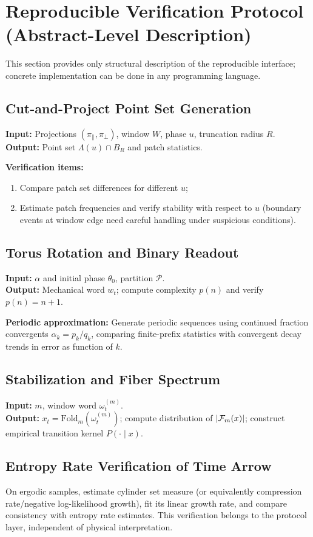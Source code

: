 \section{Reproducible Verification Protocol (Abstract-Level Description)}

This section provides only structural description of the reproducible interface; concrete implementation can be done in any programming language.

\subsection{Cut-and-Project Point Set Generation}

\textbf{Input:} Projections $(\pi_{\parallel},\pi_{\perp})$, window $W$, phase $u$, truncation radius $R$.\\
\textbf{Output:} Point set $\Lambda(u)\cap B_R$ and patch statistics.

\textbf{Verification items:}
\begin{enumerate}
  \item Compare patch set differences for different $u$;
  \item Estimate patch frequencies and verify stability with respect to $u$ (boundary events at window edge need careful handling under suspicious conditions).
\end{enumerate}

\subsection{Torus Rotation and Binary Readout}

\textbf{Input:} $\alpha$ and initial phase $\theta_0$, partition $\mathcal{P}$.\\
\textbf{Output:} Mechanical word $w_t$; compute complexity $p(n)$ and verify $p(n)=n+1$.

\textbf{Periodic approximation:} Generate periodic sequences using continued fraction convergents $\alpha_k=p_k/q_k$, comparing finite-prefix statistics with convergent decay trends in error as function of $k$.

\subsection{Stabilization and Fiber Spectrum}

\textbf{Input:} $m$, window word $\omega_t^{(m)}$.\\
\textbf{Output:} $x_t=\mathrm{Fold}_m(\omega_t^{(m)})$; compute distribution of $\left\lvert \mathcal{F}_m(x)\right\rvert$; construct empirical transition kernel $P(\cdot\mid x)$.

\subsection{Entropy Rate Verification of Time Arrow}

On ergodic samples, estimate cylinder set measure (or equivalently compression rate/negative log-likelihood growth), fit its linear growth rate, and compare consistency with entropy rate estimates. This verification belongs to the protocol layer, independent of physical interpretation.
